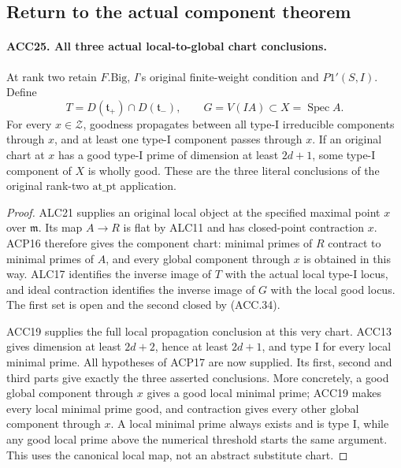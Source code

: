 \documentclass[11pt,a4paper]{article}
\numberwithin{equation}{section}
\theoremstyle{remark}\newtheorem{remark}[theorem]{Remark}
\begin{document}
\subsection{Return to the actual component theorem}

\paragraph{ACC25. All three actual local-to-global chart conclusions.}
\label{claim:ACC25}
At rank two retain \(F.\mathrm{Big}\), \(I\)'s original
finite-weight condition and \(P1'(S,I)\).  Define
\[
 T=D(\mathfrak t_+)\cap D(\mathfrak t_-),\qquad
 G=V(IA)\subset X=\operatorname{Spec}A.                   \tag{ACC.34}
\]
For every \(x\in\mathcal Z\), goodness propagates between
all type-I irreducible components through \(x\), and at least
one type-I component passes through \(x\).  If an original
chart at \(x\) has a good type-I prime of dimension at least
\(2d+1\), some type-I component of \(X\) is wholly good.
These are the three literal conclusions of the original
rank-two \(\mathrm{at\_\allowbreak pt}\) application.

\begin{proof}
ALC21 supplies an original local object at the specified maximal
point \(x\) over \(\mathfrak m\).  Its map \(A\to R\)
is flat by ALC11 and has closed-point contraction \(x\).
ACP16 therefore gives the component chart: minimal primes of
\(R\) contract to minimal primes of \(A\), and every global
component through \(x\) is obtained in this way.  ALC17 identifies
the inverse image of \(T\) with the actual local type-I locus,
and ideal contraction identifies the inverse image of \(G\)
with the local good locus.  The first set is open and the second
closed by (ACC.34).

ACC19 supplies the full local propagation conclusion at this very
chart.  ACC13 gives dimension at least \(2d+2\), hence at least
\(2d+1\), and type I for every local minimal prime.  All
hypotheses of ACP17 are now supplied.  Its first, second and third
parts give exactly the three asserted conclusions.  More concretely,
a good global component through \(x\) gives a good local minimal
prime; ACC19 makes every local minimal prime good, and contraction
gives every other global component through \(x\).  A local
minimal prime always exists and is type I, while any good local
prime above the numerical threshold starts the same argument.
This uses the canonical local map, not an abstract substitute chart.
\end{proof}
\end{document}
